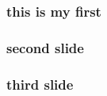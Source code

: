 \documentclass{beamer}
\begin{document}
    \begin{frame}
        \frametitle{this is my first}
    \end{frame}

    \begin{frame}
        \frametitle{second slide}
    \end{frame}

    \begin{frame}
        \frametitle{third slide}
    \end{frame}
\end{document}
